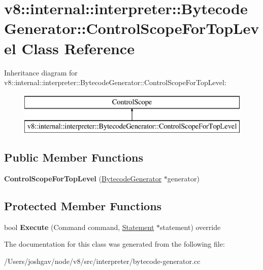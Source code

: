 \hypertarget{classv8_1_1internal_1_1interpreter_1_1_bytecode_generator_1_1_control_scope_for_top_level}{}\section{v8\+:\+:internal\+:\+:interpreter\+:\+:Bytecode\+Generator\+:\+:Control\+Scope\+For\+Top\+Level Class Reference}
\label{classv8_1_1internal_1_1interpreter_1_1_bytecode_generator_1_1_control_scope_for_top_level}
Inheritance diagram for v8\+:\+:internal\+:\+:interpreter\+:\+:Bytecode\+Generator\+:\+:Control\+Scope\+For\+Top\+Level\+:\begin{figure}[H]
\begin{center}
\leavevmode
\includegraphics[height=2.000000cm]{classv8_1_1internal_1_1interpreter_1_1_bytecode_generator_1_1_control_scope_for_top_level}
\end{center}
\end{figure}
\subsection*{Public Member Functions}
\begin{DoxyCompactItemize}
\item 
{\bfseries Control\+Scope\+For\+Top\+Level} (\hyperlink{classv8_1_1internal_1_1interpreter_1_1_bytecode_generator}{Bytecode\+Generator} $\ast$generator)\hypertarget{classv8_1_1internal_1_1interpreter_1_1_bytecode_generator_1_1_control_scope_for_top_level_addef45c15c883988d5e6dda9167b3900}{}\label{classv8_1_1internal_1_1interpreter_1_1_bytecode_generator_1_1_control_scope_for_top_level_addef45c15c883988d5e6dda9167b3900}

\end{DoxyCompactItemize}
\subsection*{Protected Member Functions}
\begin{DoxyCompactItemize}
\item 
bool {\bfseries Execute} (Command command, \hyperlink{classv8_1_1internal_1_1_statement}{Statement} $\ast$statement) override\hypertarget{classv8_1_1internal_1_1interpreter_1_1_bytecode_generator_1_1_control_scope_for_top_level_a13898e46aec1a1a2731950f8d9acd95b}{}\label{classv8_1_1internal_1_1interpreter_1_1_bytecode_generator_1_1_control_scope_for_top_level_a13898e46aec1a1a2731950f8d9acd95b}

\end{DoxyCompactItemize}


The documentation for this class was generated from the following file\+:\begin{DoxyCompactItemize}
\item 
/\+Users/joshgav/node/v8/src/interpreter/bytecode-\/generator.\+cc\end{DoxyCompactItemize}
